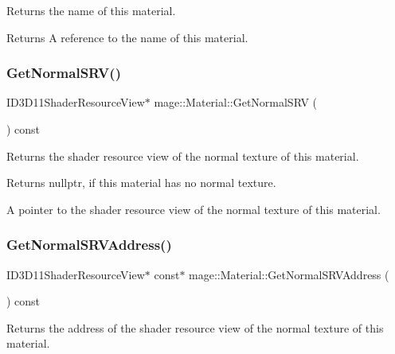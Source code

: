 Returns the name of this material.

\begin{DoxyReturn}{Returns}
A reference to the name of this material. 
\end{DoxyReturn}
\hypertarget{structmage_1_1_material_a0be98911c56dedaa4fd2f8714fc8a793}{}\label{structmage_1_1_material_a0be98911c56dedaa4fd2f8714fc8a793} 
\subsubsection{\texorpdfstring{Get\+Normal\+S\+R\+V()}{GetNormalSRV()}}
{\footnotesize\ttfamily I\+D3\+D11\+Shader\+Resource\+View$\ast$ mage\+::\+Material\+::\+Get\+Normal\+S\+RV (\begin{DoxyParamCaption}{ }\end{DoxyParamCaption}) const\hspace{0.3cm}{\ttfamily [noexcept]}}

Returns the shader resource view of the normal texture of this material.

\begin{DoxyReturn}{Returns}
{\ttfamily nullptr}, if this material has no normal texture. 

A pointer to the shader resource view of the normal texture of this material. 
\end{DoxyReturn}
\hypertarget{structmage_1_1_material_a297911bb366b1cc1b28d0c35353eb806}{}\label{structmage_1_1_material_a297911bb366b1cc1b28d0c35353eb806} 
\subsubsection{\texorpdfstring{Get\+Normal\+S\+R\+V\+Address()}{GetNormalSRVAddress()}}
{\footnotesize\ttfamily I\+D3\+D11\+Shader\+Resource\+View$\ast$ const$\ast$ mage\+::\+Material\+::\+Get\+Normal\+S\+R\+V\+Address (\begin{DoxyParamCaption}{ }\end{DoxyParamCaption}) const\hspace{0.3cm}{\ttfamily [noexcept]}}

Returns the address of the shader resource view of the normal texture of this material.

